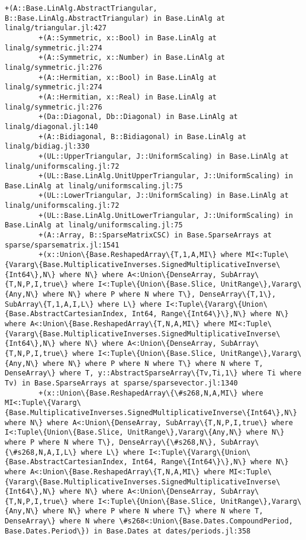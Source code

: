 \documentclass[11pt]{article}
\begin{document}
\begin{Verbatim}[commandchars=\\\{\}]
        +(A::Base.LinAlg.AbstractTriangular, B::Base.LinAlg.AbstractTriangular) in Base.LinAlg at linalg/triangular.jl:427
        +(A::Symmetric, x::Bool) in Base.LinAlg at linalg/symmetric.jl:274
        +(A::Symmetric, x::Number) in Base.LinAlg at linalg/symmetric.jl:276
        +(A::Hermitian, x::Bool) in Base.LinAlg at linalg/symmetric.jl:274
        +(A::Hermitian, x::Real) in Base.LinAlg at linalg/symmetric.jl:276
        +(Da::Diagonal, Db::Diagonal) in Base.LinAlg at linalg/diagonal.jl:140
        +(A::Bidiagonal, B::Bidiagonal) in Base.LinAlg at linalg/bidiag.jl:330
        +(UL::UpperTriangular, J::UniformScaling) in Base.LinAlg at linalg/uniformscaling.jl:72
        +(UL::Base.LinAlg.UnitUpperTriangular, J::UniformScaling) in Base.LinAlg at linalg/uniformscaling.jl:75
        +(UL::LowerTriangular, J::UniformScaling) in Base.LinAlg at linalg/uniformscaling.jl:72
        +(UL::Base.LinAlg.UnitLowerTriangular, J::UniformScaling) in Base.LinAlg at linalg/uniformscaling.jl:75
        +(A::Array, B::SparseMatrixCSC) in Base.SparseArrays at sparse/sparsematrix.jl:1541
        +(x::Union\{Base.ReshapedArray\{T,1,A,MI\} where MI<:Tuple\{Vararg\{Base.MultiplicativeInverses.SignedMultiplicativeInverse\{Int64\},N\} where N\} where A<:Union\{DenseArray, SubArray\{T,N,P,I,true\} where I<:Tuple\{Union\{Base.Slice, UnitRange\},Vararg\{Any,N\} where N\} where P where N where T\}, DenseArray\{T,1\}, SubArray\{T,1,A,I,L\} where L\} where I<:Tuple\{Vararg\{Union\{Base.AbstractCartesianIndex, Int64, Range\{Int64\}\},N\} where N\} where A<:Union\{Base.ReshapedArray\{T,N,A,MI\} where MI<:Tuple\{Vararg\{Base.MultiplicativeInverses.SignedMultiplicativeInverse\{Int64\},N\} where N\} where A<:Union\{DenseArray, SubArray\{T,N,P,I,true\} where I<:Tuple\{Union\{Base.Slice, UnitRange\},Vararg\{Any,N\} where N\} where P where N where T\} where N where T, DenseArray\} where T, y::AbstractSparseArray\{Tv,Ti,1\} where Ti where Tv) in Base.SparseArrays at sparse/sparsevector.jl:1340
        +(x::Union\{Base.ReshapedArray\{\#s268,N,A,MI\} where MI<:Tuple\{Vararg\{Base.MultiplicativeInverses.SignedMultiplicativeInverse\{Int64\},N\} where N\} where A<:Union\{DenseArray, SubArray\{T,N,P,I,true\} where I<:Tuple\{Union\{Base.Slice, UnitRange\},Vararg\{Any,N\} where N\} where P where N where T\}, DenseArray\{\#s268,N\}, SubArray\{\#s268,N,A,I,L\} where L\} where I<:Tuple\{Vararg\{Union\{Base.AbstractCartesianIndex, Int64, Range\{Int64\}\},N\} where N\} where A<:Union\{Base.ReshapedArray\{T,N,A,MI\} where MI<:Tuple\{Vararg\{Base.MultiplicativeInverses.SignedMultiplicativeInverse\{Int64\},N\} where N\} where A<:Union\{DenseArray, SubArray\{T,N,P,I,true\} where I<:Tuple\{Union\{Base.Slice, UnitRange\},Vararg\{Any,N\} where N\} where P where N where T\} where N where T, DenseArray\} where N where \#s268<:Union\{Base.Dates.CompoundPeriod, Base.Dates.Period\}) in Base.Dates at dates/periods.jl:358

\end{Verbatim}
\end{document}
